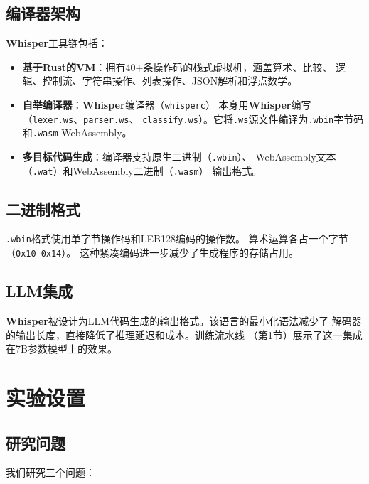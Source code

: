 \documentclass[11pt,a4paper]{ctexart}
\begin{document}
\subsection{编译器架构}

\textbf{Whisper}工具链包括：

\begin{itemize}
\item \textbf{基于Rust的VM}：拥有40+条操作码的栈式虚拟机，涵盖算术、比较、
  逻辑、控制流、字符串操作、列表操作、JSON解析和浮点数学。
\item \textbf{自举编译器}：\textbf{Whisper}编译器（\texttt{whisperc}）
  本身用\textbf{Whisper}编写（\texttt{lexer.ws}、\texttt{parser.ws}、
  \texttt{classify.ws}）。它将\texttt{.ws}源文件编译为\texttt{.wbin}字节码
  和\texttt{.wasm} WebAssembly。
\item \textbf{多目标代码生成}：编译器支持原生二进制（\texttt{.wbin}）、
  WebAssembly文本（\texttt{.wat}）和WebAssembly二进制（\texttt{.wasm}）
  输出格式。
\end{itemize}

\subsection{二进制格式}

\texttt{.wbin}格式使用单字节操作码和LEB128编码的操作数。
算术运算各占一个字节（\texttt{0x10}--\texttt{0x14}）。
这种紧凑编码进一步减少了生成程序的存储占用。

\subsection{LLM集成}

\textbf{Whisper}被设计为LLM代码生成的输出格式。该语言的最小化语法减少了
解码器的输出长度，直接降低了推理延迟和成本。训练流水线
（第\ref{sec:experiments}节）展示了这一集成在7B参数模型上的效果。

\section{实验设置}
\label{sec:experiments}

\subsection{研究问题}

我们研究三个问题：
\end{document}
